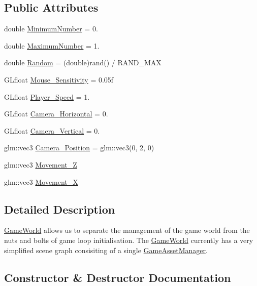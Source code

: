 \subsection*{Public Attributes}
\begin{DoxyCompactItemize}
\item 
double \hyperlink{classGameWorld_a54ccf4cf03172ab8779e9c326c8846ed}{Minimum\+Number} = 0.
\item 
double \hyperlink{classGameWorld_a1cddcf233625a98581eaeb9fd7c8c574}{Maximum\+Number} = 1.
\item 
double \hyperlink{classGameWorld_a56652cc9880b3ba1be61395066c863c3}{Random} = (double)rand() / R\+A\+N\+D\+\_\+\+M\+A\+X
\item 
G\+Lfloat \hyperlink{classGameWorld_a9bf4eb977e6ab9299aaef1345c4fa4dd}{Mouse\+\_\+\+Sensitivity} = 0.\+05f
\item 
G\+Lfloat \hyperlink{classGameWorld_ae8ab2ac372729cec44ea316f6bdf45ca}{Player\+\_\+\+Speed} = 1.
\item 
G\+Lfloat \hyperlink{classGameWorld_a7f4911dda9b3b4e4eb03ece87e16cd96}{Camera\+\_\+\+Horizontal} = 0.
\item 
G\+Lfloat \hyperlink{classGameWorld_a26658e739c4d267b1be35ed820089931}{Camera\+\_\+\+Vertical} = 0.
\item 
glm\+::vec3 \hyperlink{classGameWorld_ad80e597474ea4c52a583e81788187571}{Camera\+\_\+\+Position} = glm\+::vec3(0, 2, 0)
\item 
glm\+::vec3 \hyperlink{classGameWorld_a8dd30ba92e7fa9b9b05075e31d1e7dd8}{Movement\+\_\+\+Z}
\item 
glm\+::vec3 \hyperlink{classGameWorld_a968eb29424b68f7cd79a5896c62e944d}{Movement\+\_\+\+X}
\end{DoxyCompactItemize}


\subsection{Detailed Description}
\hyperlink{classGameWorld}{Game\+World} allows us to separate the management of the game world from the nuts and bolts of game loop initialisation. The \hyperlink{classGameWorld}{Game\+World} currently has a very simplified scene graph consisiting of a single \hyperlink{classGameAssetManager}{Game\+Asset\+Manager}. 

\subsection{Constructor \& Destructor Documentation}
\hypertarget{classGameWorld_a17a84e57a80600961088afc753036f89}{}
